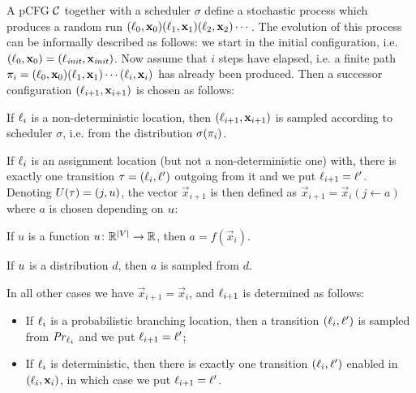 \smallskip{}
A pCFG $\mathcal{C}$ together with a scheduler $\sigma$ define a stochastic 
process which produces a random run 
$(\ell_0,\mathbf{x}_0)(\ell_1,\mathbf{x}_1)(\ell_2,\mathbf{x}_2)\cdots$. The evolution 
of 
this process can be informally described as follows: we start in the initial 
configuration, i.e. $(\ell_{0},\mathbf{x}_0)=(\ell_{\mathit{init}},\mathbf{x}_{\mathit{init}})$. 
Now assume that $i$ 
steps have elapsed, i.e. a finite path 
$\pi_i=(\ell_0,\mathbf{x}_0)(\ell_1,\mathbf{x}_1)\cdots(\ell_i,\mathbf{x}_i)$ has 
already 
been produced. Then a successor configuration $(\ell_{i+1},\mathbf{x}_{i+1})$ is 
chosen as follows:
\begin{compactitem}
\item
If $\ell_i$ is a non-deterministic location, then 
$(\ell_{i+1},\mathbf{x}_{i+1})$ is sampled according to scheduler $\sigma$, i.e. 
from 
the distribution $\sigma(\pi_i)$.
\item
If $\ell_i$ is an assignment location (but not a non-deterministic one) with, 
there 
is exactly one transition $\tau=(\ell_i,\ell')$ outgoing from it and we put 
$\ell_{i+1}=\ell'$. Denoting $U(\tau)=(j,u)$, the vector 
$\vec{x}_{i+1}$ is 
then defined as 
$\vec{x}_{i+1}=\vec{x}_{i}(j\leftarrow a)$ where $a$ is chosen depending on 
$u$:
\begin{compactitem}
\item If $u$ is a function $u\colon
\mathbb{R}^{|V|}\rightarrow \mathbb{R}$, then $a=f(\vec{x}_{i})$.
\item If $u$ is a distribution $d$, then $a$ 
is sampled from $d$.
\end{compactitem}
\item In all other cases we have $\vec{x}_{i+1}=\vec{x}_i$, and $\ell_{i+1}$ is 
determined as follows:
\begin{itemize}
	\item If $\ell_i$ is a probabilistic branching location, then a transition 
	$(\ell_i,\ell')$ is sampled from $\mathit{Pr}_{\ell_i}$ and we put
	$\ell_{i+1}=\ell'$;
	\item If $\ell_i$ is deterministic, then there is exactly one transition 
	$(\ell_i,\ell')$ enabled in $(\ell_i,\mathbf{x}_i)$, in which case we put 
	$\ell_{i+1}=\ell'$.
\end{itemize}
\end{compactitem}


